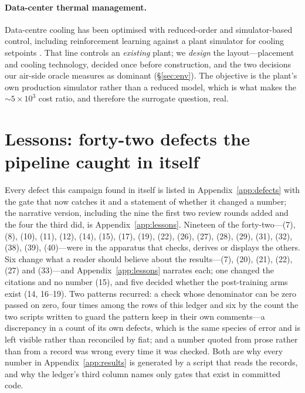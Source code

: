 \documentclass{article}
\begin{document}
\paragraph{Data-center thermal management.}
Data-centre cooling has been optimised with reduced-order and simulator-based control,
including reinforcement learning against a plant simulator for cooling setpoints
\citep{meta2024cooling}.  That line controls an \emph{existing} plant; we \emph{design}
the layout---placement and cooling technology, decided once before construction, and the two
decisions our air-side oracle measures as dominant (\S\ref{sec:env}).  The objective is the
plant's own production simulator rather than a reduced model, which is what makes the
${\sim}5\times10^3$ cost ratio, and therefore the surrogate question, real.




\appendix

\section{Lessons: forty-two defects the pipeline caught in itself}
\label{sec:lessons}
Every defect this campaign found in itself is listed in Appendix~\ref{app:defects} with
the gate that now catches it and a statement of whether it changed a number; the
narrative version, including the nine the first two review rounds added and the four the third did, is Appendix~\ref{app:lessons}.  Nineteen of the forty-two---(7), (8), (10), (11), (12), (14), (15), (17), (19), (22), (26), (27), (28), (29), (31), (32), (38), (39), (40)---were in the apparatus that checks, derives or displays the others.  Six change what a reader should
believe about the results---(7), (20), (21), (22), (27) and (33)---and Appendix~\ref{app:lessons}
narrates each; one changed the citations and no number (15), and five decided whether the
post-training arms exist (14, 16--19).  Two patterns recurred: a
check whose denominator can be zero passed on zero, four times among the rows of this
ledger and six by the count the two scripts written to guard the pattern keep in their own
comments---a discrepancy in a count of its own defects, which is the same species of error
and is left visible rather than reconciled by fiat; and a number quoted from
prose rather than from a record was wrong every time it was checked.  Both are why every
number in Appendix~\ref{app:results} is generated by a script that reads the records, and
why the ledger's third column names only gates that exist in committed code.
\end{document}
